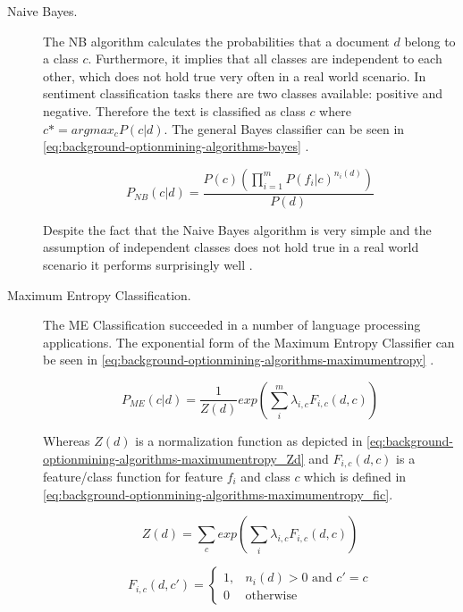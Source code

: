 \begin{description}
	\item[Naive Bayes.] 
    The \ac{NB} algorithm calculates the probabilities that a document $d$ belong to a class $c$.
	Furthermore, it implies that all classes are independent to each other, which does not hold true very often in a real world scenario.
	In sentiment classification tasks there are two classes available: positive and negative.
	Therefore the text is classified as class $c$ where $c* = arg max_c P(c | d)$.
	The general Bayes classifier can be seen in \autoref{eq:background-optionmining-algorithms-bayes} \cite{Pang2002}.
	
	\begin{equation}
		P_{NB}(c|d) = \frac{P(c) (\prod_{i=1}^{m} P(f_i|c)^{n_i(d)}) }{P(d)}
		\label{eq:background-optionmining-algorithms-bayes}
	\end{equation}
	
	Despite the fact that the Naive Bayes algorithm is very simple and the assumption of independent classes does not hold true in a real world scenario it performs surprisingly well \cite{Pang2002}.
	
	\item[Maximum Entropy Classification.]
  The \ac{ME} Classification succeeded in a number of language processing applications.
  The exponential form of the Maximum Entropy Classifier can be seen in \autoref{eq:background-optionmining-algorithms-maximumentropy} \cite{Pang2002}.
  
  \begin{equation}
		P_{ME}(c|d) = \frac{1}{Z(d)} exp \left( \sum_i^m \lambda_{i,c}F_{i,c}(d,c) \right)
		\label{eq:background-optionmining-algorithms-maximumentropy}
  \end{equation}
  
  Whereas $Z(d)$ is a normalization function as depicted in \autoref{eq:background-optionmining-algorithms-maximumentropy_Zd} \cite{Nigam1999} and $F_{i,c}(d,c)$ is a feature/class function for feature $f_i$ and class $c$ which is defined in \autoref{eq:background-optionmining-algorithms-maximumentropy_fic}.

  \begin{equation}
    Z(d) = \sum_c exp(\sum_i \lambda_{i,c} F_{i,c}(d,c))
      \label{eq:background-optionmining-algorithms-maximumentropy_Zd}
  \end{equation}

  \begin{equation}
  F_{i,c}(d,c') = 
    \begin{cases}
      1, & n_i(d) > 0 \text{ and } c' = c \\
      0  & \text{otherwise}
    \end{cases}
		\label{eq:background-optionmining-algorithms-maximumentropy_fic}
  \end{equation}


\end{description}
